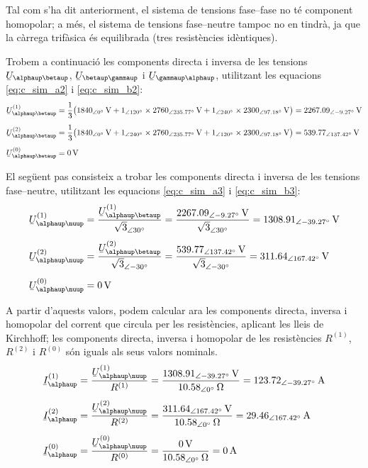 \begin{exemple}
    Tal com s'ha dit anteriorment, el sistema de tensions fase--fase no
    t\'{e} component homopolar; a m\'{e}s, el sistema de tensions fase--neutre
    tampoc no en tindr\`{a}, ja que la c\`{a}rrega trif\`{a}sica \'{e}s equilibrada
    (tres resist\`{e}ncies id\`{e}ntiques).

    Trobem a continuaci\'{o} les components directa i inversa de les
    tensions $\cmplx{U}_{\alphaup\betaup}$, $\cmplx{U}_{\betaup\gammaup}$ i
    $\cmplx{U}_{\gammaup\alphaup}$, utilitzant les equacions
    \eqref{eq:c_sim_a2} i \eqref{eq:c_sim_b2}:
    \begin{align*}
    \cmplx{U}_{\alphaup\betaup}\ap{(1)} &= \frac{1}{3} \big(
    \SIpd{1840}{0}{V} + \numpd{1}{120} \times \SIpd{2760}{235,77}{V} +
    \numpd{1}{240} \times \SIpd{2300}{97,18}{V}\big) = \SIpd{2267,09}{-9,27}{V} \\[1ex]
    \cmplx{U}_{\alphaup\betaup}\ap{(2)} &= \frac{1}{3} \big(
    \SIpd{1840}{0}{V} + \numpd{1}{240} \times \SIpd{2760}{235,77}{V} +
    \numpd{1}{120} \times \SIpd{2300}{97,18}{V} \big) = \SIpd{539,77}{137,42}{V} \\[1ex]
    \cmplx{U}_{\alphaup\betaup}\ap{(0)} &= \SI{0}{V}
    \end{align*}

    El seg\"{u}ent pas consisteix a trobar les components directa i inversa
    de les tensions fase--neutre, utilitzant les equacions
    \eqref{eq:c_sim_a3} i \eqref{eq:c_sim_b3}:
    \begin{align*}
    \cmplx{U}_{\alphaup\nuup}\ap{(1)} &=
    \frac{\cmplx{U}_{\alphaup\betaup}\ap{(1)}}{\sqrt{3}_{\angle\ang{30}}} =
    \frac{\SIpd{2267,09}{-9,27}{V}}{\sqrt{3}_{\angle\ang{30}}} =
    \SIpd{1308,91}{-39,27}{V} \\[1ex]
    \cmplx{U}_{\alphaup\nuup}\ap{(2)} &=
    \frac{\cmplx{U}_{\alphaup\betaup}\ap{(2)}}{\sqrt{3}_{\angle\ang{-30}}} =
    \frac{\SIpd{539,77}{137,42}{V}}{\sqrt{3}_{\angle\ang{-30}}} =
    \SIpd{311,64}{167,42}{V} \\[1ex]
    \cmplx{U}_{\alphaup\nuup}\ap{(0)} &= \SI{0}{V}
    \end{align*}

    A partir d'aquests valors, podem calcular ara les components
    directa, inversa i homopolar del corrent que circula per les
    resist\`{e}ncies, aplicant les lleis de Kirchhoff; les components
    directa, inversa i homopolar de les resist\`{e}ncies $R^{(1)}$,
    $R^{(2)}$ i $R^{(0)}$ s\'{o}n iguals als seus valors nominals.
    \begin{align*}
    \cmplx{I}_\alphaup\ap{(1)} &=
    \frac{\cmplx{U}_{\alphaup\nuup}\ap{(1)}}{R^{(1)}} =
    \frac{\SIpd{1308,91}{-39,27}{V}}{\SIpd{10,58}{0}{\ohm}} =
    \SIpd{123,72}{-39,27}{A} \\[1ex]
    \cmplx{I}_\alphaup\ap{(2)} &=
    \frac{\cmplx{U}_{\alphaup\nuup}\ap{(2)}}{R^{(2)}} =
    \frac{\SIpd{311,64}{167,42}{V}}{\SIpd{10,58}{0}{\ohm}} =
    \SIpd{29,46}{167,42}{A} \\[1ex]
    \cmplx{I}_\alphaup\ap{(0)} &=
    \frac{\cmplx{U}_{\alphaup\nuup}\ap{(0)}}{R^{(0)}} =
    \frac{\SI{0}{V}}{\SIpd{10,58}{0}{\ohm}} =
    \SI{0}{A}
    \end{align*}


\end{exemple}

